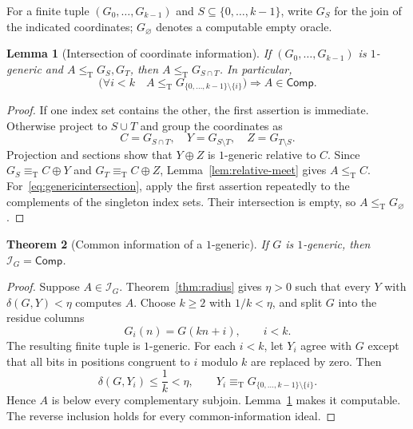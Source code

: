 \documentclass[11pt,a4paper]{article}
\newcommand{\leT}{\leq_{\mathrm T}}
\newcommand{\eqT}{\equiv_{\mathrm T}}
\newcommand{\Comp}{\mathsf{Comp}}
\newcommand{\Core}{\mathcal I}
\newtheorem{theorem}{Theorem}[section]
\newtheorem{lemma}[theorem]{Lemma}
\theoremstyle{definition}\newtheorem{definition}[theorem]{Definition}
\theoremstyle{remark}\newtheorem{remark}[theorem]{Remark}
\begin{document}
For a finite tuple $(G_0,\ldots,G_{k-1})$ and $S\subseteq\{0,\ldots,k-1\}$, write $G_S$ for the join of the indicated coordinates; $G_\varnothing$ denotes a computable empty oracle.

\begin{lemma}[Intersection of coordinate information]\label{lem:intersect}
If $(G_0,\ldots,G_{k-1})$ is $1$-generic and $A\leT G_S,G_T$, then $A\leT G_{S\cap T}$. In particular,
\begin{equation}
 \bigl(\forall i<k\quad A\leT G_{\{0,\ldots,k-1\}\setminus\{i\}}\bigr)
                    \Longrightarrow A\in\Comp.
 \label{eq:genericintersection}
\end{equation}
\end{lemma}
\begin{proof}
If one index set contains the other, the first assertion is immediate. Otherwise project to $S\cup T$ and group the coordinates as
\[
 C=G_{S\cap T},\quad Y=G_{S\setminus T},\quad Z=G_{T\setminus S}.
\]
Projection and sections show that $Y\oplus Z$ is $1$-generic relative to $C$. Since $G_S\eqT C\oplus Y$ and $G_T\eqT C\oplus Z$, Lemma~\ref{lem:relative-meet} gives $A\leT C$. For~\eqref{eq:genericintersection}, apply the first assertion repeatedly to the complements of the singleton index sets. Their intersection is empty, so $A\leT G_\varnothing$.
\end{proof}

\begin{theorem}[Common information of a $1$-generic]\label{thm:genericcore}
If $G$ is $1$-generic, then $\Core_G=\Comp$.
\end{theorem}
\begin{proof}
Suppose $A\in\Core_G$. Theorem~\ref{thm:radius} gives $\eta>0$ such that every $Y$ with $\delta(G,Y)<\eta$ computes $A$. Choose $k\ge2$ with $1/k<\eta$, and split $G$ into the residue columns
\[
                         G_i(n)=G(kn+i),\qquad i<k.
\]
The resulting finite tuple is $1$-generic. For each $i<k$, let $Y_i$ agree with $G$ except that all bits in positions congruent to $i$ modulo $k$ are replaced by zero. Then
\[
 \delta(G,Y_i)\le\frac1k<\eta,
 \qquad Y_i\eqT G_{\{0,\ldots,k-1\}\setminus\{i\}}.
\]
Hence $A$ is below every complementary subjoin. Lemma~\ref{lem:intersect} makes it computable. The reverse inclusion holds for every common-information ideal.
\end{proof}
\end{document}

